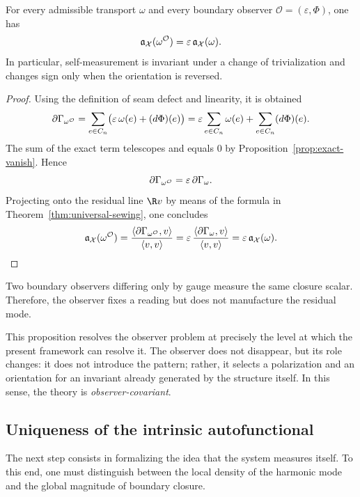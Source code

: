 \begin{proposition}\label{prop:observer-covariance}
For every admissible transport $\omega$ and every boundary observer
$\mathcal O=(\varepsilon,\Phi)$, one has
\[
\mathfrak a_\mathcal X(\omega^{\mathcal O})=\varepsilon\,\mathfrak a_\mathcal X(\omega).
\]
In particular, self-measurement is invariant under a change of trivialization and changes sign only when
the orientation is reversed.
\end{proposition}

\begin{proof}
Using the definition of seam defect and linearity, it is obtained
\[
\partial\Gamma_{\omega^{\mathcal O}}
=
\sum_{e\in C_n}\bigl(\varepsilon\,\omega(e)+(d\Phi)(e)\bigr)
=
\varepsilon\sum_{e\in C_n}\omega(e)+\sum_{e\in C_n}(d\Phi)(e).
\]
The sum of the exact term telescopes and equals $0$ by
Proposition~\ref{prop:exact-vanish}. Hence
\[
\partial\Gamma_{\omega^{\mathcal O}}=\varepsilon\,\partial\Gamma_\omega.
\]
Projecting onto the residual line $\R v$ by means of the formula in
Theorem~\ref{thm:universal-sewing}, one concludes
\[
\mathfrak a_\mathcal X(\omega^{\mathcal O})
=
\frac{\langle \partial\Gamma_{\omega^{\mathcal O}},v\rangle}{\langle v,v\rangle}
=
\varepsilon\,\frac{\langle \partial\Gamma_\omega,v\rangle}{\langle v,v\rangle}
=
\varepsilon\,\mathfrak a_\mathcal X(\omega).
\]
\end{proof}

\begin{corollary}\label{cor:observer-does-not-create}
Two boundary observers differing only by gauge measure the same closure scalar. Therefore,
the observer fixes a reading but does not manufacture the residual mode.
\end{corollary}

\begin{remark}
This proposition resolves the observer problem at precisely the level at which the present framework
can resolve it. The observer does not disappear, but its role changes: it does not introduce the pattern; rather,
it selects a polarization and an orientation for an invariant already generated by the
structure itself. In this sense, the theory is \emph{observer-covariant}.
\end{remark}

\subsection{Uniqueness of the intrinsic autofunctional}

The next step consists in formalizing the idea that the system measures itself. To this end, one must
distinguish between the local density of the harmonic mode and the global magnitude of boundary closure.


